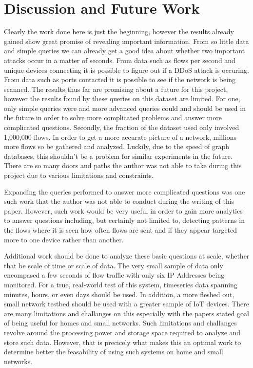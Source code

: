 \documentclass[conference]{IEEEtran}
\begin{document}
\section{Discussion and Future Work}

Clearly the work done here is just the beginning, however the results already gained show great promise of revealing
important information. From so little data and simple queries we can already get a good idea about whether two 
important attacks occur in a matter of seconds. From data such as flows per second and unique devices connecting it is possible to figure 
out if a DDoS attack is occuring. From data such as ports contacted it is possible to see if the network is being
scanned. The results thus far are promising about a future for this project, however the results found by these
queries on this dataset are limited. For one, only simple queries were and more advanced queries could and should 
be used in the future in order to solve more complicated problems and answer more complicated questions. Secondly, 
the fraction of the dataset used only involved 1,000,000 flows. In order to get a more accurate picture of a network, 
millions more flows so be gathered and analyzed. Luckily, due to the speed of graph databases, this shouldn't be a 
problem for similar experiments in the future. There are so many doors and paths the author was not able to take 
during this project due to various limitations and constraints. 

Expanding the queries performed to answer more complicated questions was one such work that the author was not able 
to conduct during the writing of this paper. However, such work would be very useful in order to gain more analytics
to answer questions including, but certainly not limited to, detecting patterns in the flows where it is seen how 
often flows are sent and if they appear targeted more to one device rather than another. 

Additional work should be done to analyze these basic questions at scale, whether that be scale of time or scale of 
data. The very small sample of data only encompased a few seconds of flow traffic with only six IP Addresses being
monitored. For a true, real-world test of this system, timeseries data spanning minutes, hours, or even days should 
be used. In addition, a more fleshed out, small network testbed should be used with a greater sample of IoT devices. 
There are many limitations and challanges on this especially with the papers stated goal of being useful for homes and
small networks. Such limitations and challanges revolve around the processing power and storage space required to
analyze and store such data. However, that is precicely what makes this an optimal work to determine better the 
feasability of using such systems on home and small networks.
\end{document}
